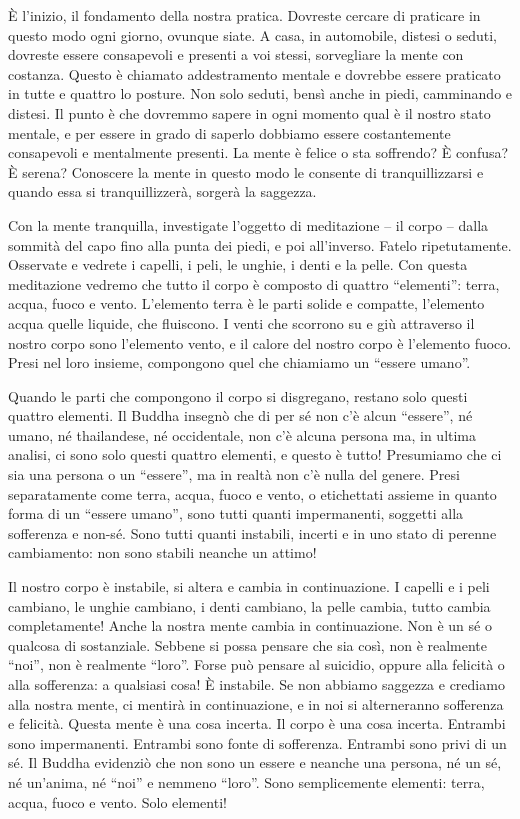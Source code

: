 È l'inizio, il fondamento della nostra pratica. Dovreste cercare di
praticare in questo modo ogni giorno, ovunque siate. A casa, in
automobile, distesi o seduti, dovreste essere consapevoli e presenti a
voi stessi, sorvegliare la mente con costanza. Questo è chiamato
addestramento mentale e dovrebbe essere praticato in tutte e quattro lo
posture. Non solo seduti, bensì anche in piedi, camminando e distesi. Il
punto è che dovremmo sapere in ogni momento qual è il nostro stato
mentale, e per essere in grado di saperlo dobbiamo essere costantemente
consapevoli e mentalmente presenti. La mente è felice o sta soffrendo? È
confusa? È serena? Conoscere la mente in questo modo le consente di
tranquillizzarsi e quando essa si tranquillizzerà, sorgerà la saggezza.

Con la mente tranquilla, investigate l'oggetto di meditazione -- il
corpo -- dalla sommità del capo fino alla punta dei piedi, e poi
all'inverso. Fatelo ripetutamente. Osservate e vedrete i capelli, i
peli, le unghie, i denti e la pelle. Con questa meditazione vedremo che
tutto il corpo è composto di quattro ``elementi'': terra, acqua, fuoco e
vento. L'elemento terra è le parti solide e compatte, l'elemento acqua
quelle liquide, che fluiscono. I venti che scorrono su e giù attraverso
il nostro corpo sono l'elemento vento, e il calore del nostro corpo è
l'elemento fuoco. Presi nel loro insieme, compongono quel che chiamiamo
un ``essere umano''.

Quando le parti che compongono il corpo si disgregano, restano solo
questi quattro elementi. Il Buddha insegnò che di per sé non c'è alcun
``essere'', né umano, né thailandese, né occidentale, non c'è alcuna
persona ma, in ultima analisi, ci sono solo questi quattro elementi, e
questo è tutto! Presumiamo che ci sia una persona o un ``essere'', ma in
realtà non c'è nulla del genere. Presi separatamente come terra, acqua,
fuoco e vento, o etichettati assieme in quanto forma di un ``essere
umano'', sono tutti quanti impermanenti, soggetti alla sofferenza e
non-sé. Sono tutti quanti instabili, incerti e in uno stato di perenne
cambiamento: non sono stabili neanche un attimo!

Il nostro corpo è instabile, si altera e cambia in continuazione. I
capelli e i peli cambiano, le unghie cambiano, i denti cambiano, la
pelle cambia, tutto cambia completamente! Anche la nostra mente cambia
in continuazione. Non è un sé o qualcosa di sostanziale. Sebbene si
possa pensare che sia così, non è realmente ``noi'', non è realmente
``loro''. Forse può pensare al suicidio, oppure alla felicità o alla
sofferenza: a qualsiasi cosa! È instabile. Se non abbiamo saggezza e
crediamo alla nostra mente, ci mentirà in continuazione, e in noi si
alterneranno sofferenza e felicità. Questa mente è una cosa incerta. Il
corpo è una cosa incerta. Entrambi sono impermanenti. Entrambi sono
fonte di sofferenza. Entrambi sono privi di un sé. Il Buddha evidenziò
che non sono un essere e neanche una persona, né un sé, né un'anima, né
``noi'' e nemmeno ``loro''. Sono semplicemente elementi: terra, acqua,
fuoco e vento. Solo elementi!

